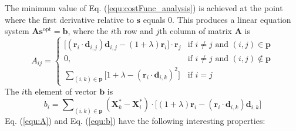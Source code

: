 The minimum value of Eq. (\ref{equ:costFunc_analysis}) is achieved at the point where the first derivative relative to $\mathbf{s}$ equals 0. This produces a linear equation system $\mathbf{A}\mathbf{s}^\text{opt}= \mathbf{b}$, where the $i$th row and $j$th column of matrix $\mathbf{A}$ is
\begin{equation}
A_{ij}= \begin{cases}
\lbrack(\mathbf{r}_i\cdot\mathbf{d}_{i,j})\mathbf{d}_{i,j}-(1+\lambda)\mathbf{r}_i\rbrack\cdot\mathbf{r}_j  & \text{if } i\neq j \text{ and } (i,j)\in \mathbf{p}\\
0, & \text{if } i\neq j \text{ and } (i,j)\notin \mathbf{p}\\
\sum_{(i,k)\in{\mathbf{p}}}{\lbrack 1+\lambda - (\mathbf{r}_i\cdot\mathbf{d}_{i,k})^2 \rbrack } & \text{if } i=j
\end{cases}
\label{equ:A}
\end{equation}
The $i$th element of vector $\mathbf{b}$ is
\begin{equation}
b_i=\sum\nolimits_{(i,k)\in{\mathbf{p}}}(\mathbf{X}_k^*-\mathbf{X}_i^*)\cdot \lbrack(1+\lambda)\mathbf{r}_i - (\mathbf{r}_i\cdot \mathbf{d}_{i,k})\mathbf{d}_{i,k} \rbrack
\label{equ:b}
\end{equation}
Eq. (\ref{equ:A}) and Eq. (\ref{equ:b}) have the following interesting properties:
